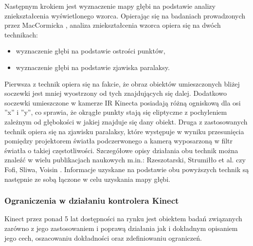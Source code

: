 Następnym krokiem jest wyznaczenie mapy głębi na podstawie analizy zniekształcenia wyświetlonego wzorca. Opierając się na badaniach prowadzonych przez MacCormicka \cite{MacCormick2011}, analiza zniekształcenia wzorca opiera się na dwóch technikach:
		
\begin{itemize}
	\item wyznaczenie głębi na podstawie ostrości punktów,
	\item wyznaczenie głębi na podstawie zjawiska paralaksy.
\end{itemize}
		
Pierwsza z technik opiera się na fakcie, że obraz obiektów umieszczonych bliżej soczewki jest mniej wyostrzony od tych znajdujących się dalej. Dodatkowo soczewki umieszczone w kamerze IR Kinecta posiadają różną ogniskową dla osi ''x'' i ''y'', co sprawia, że okrągłe punkty stają się eliptyczne z pochyleniem zależnym od głębokości w jakiej znajduje się dany obiekt. Druga z zastosowanych technik opiera się na zjawisku paralaksy, które występuje w wyniku przesunięcia pomiędzy projektorem światła podczerwonego a kamerą wyposarzoną w filtr światła o takiej częstotliwości. Szczegółowe opisy działania obu technik można znaleźć w wielu publikacjach naukowych m.in.: Rzeszotarski, Strumiłło et al. \cite{Rzeszotarski2006} czy Fofi, Sliwa, Voisin \cite{Fofi2004}. Informacje uzyskane na podstawie obu powyższych technik są następnie ze sobą łączone w celu uzyskania mapy głębi.
		
\subsubsection*{Ograniczenia w działaniu kontrolera Kinect}\label{ssec:characteristics:kinect:limitation}
		
Kinect przez ponad 5 lat dostępności na rynku jest obiektem badań związanych zarówno z jego zastosowaniem i poprawą działania jak i dokładnym opisaniem jego cech, oszacowaniu dokładności oraz zdefiniowaniu ograniczeń. 
		
